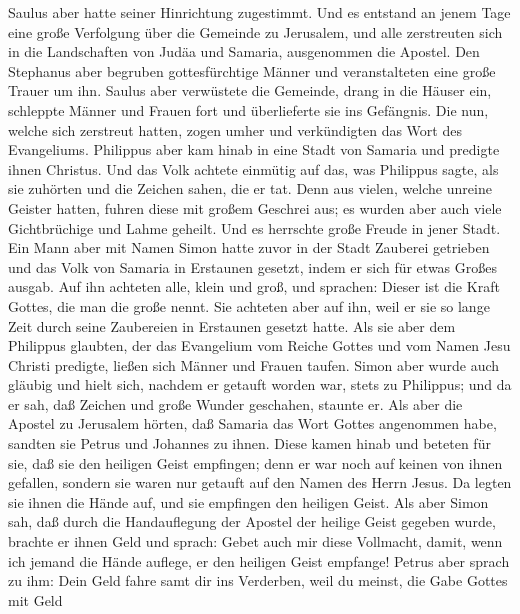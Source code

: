  Saulus aber hatte seiner Hinrichtung zugestimmt. Und es
entstand an jenem Tage eine große Verfolgung über die Gemeinde zu
Jerusalem, und alle zerstreuten sich in die Landschaften von Judäa und
Samaria, ausgenommen die Apostel.  Den Stephanus aber
begruben gottesfürchtige Männer und veranstalteten eine große Trauer um
ihn.  Saulus aber verwüstete die Gemeinde, drang in die
Häuser ein, schleppte Männer und Frauen fort und überlieferte sie ins
Gefängnis.  Die nun, welche sich zerstreut hatten, zogen
umher und verkündigten das Wort des Evangeliums. 
Philippus aber kam hinab in eine Stadt von Samaria und predigte ihnen
Christus.  Und das Volk achtete einmütig auf das, was
Philippus sagte, als sie zuhörten und die Zeichen sahen, die er tat.
 Denn aus vielen, welche unreine Geister hatten, fuhren
diese mit großem Geschrei aus; es wurden aber auch viele Gichtbrüchige
und Lahme geheilt.  Und es herrschte große Freude in jener
Stadt.  Ein Mann aber mit Namen Simon hatte zuvor in der
Stadt Zauberei getrieben und das Volk von Samaria in Erstaunen gesetzt,
indem er sich für etwas Großes ausgab.  Auf ihn achteten
alle, klein und groß, und sprachen: Dieser ist die Kraft Gottes, die man
die große nennt.  Sie achteten aber auf ihn, weil er sie
so lange Zeit durch seine Zaubereien in Erstaunen gesetzt hatte.
 Als sie aber dem Philippus glaubten, der das Evangelium
vom Reiche Gottes und vom Namen Jesu Christi predigte, ließen sich
Männer und Frauen taufen.  Simon aber wurde auch gläubig
und hielt sich, nachdem er getauft worden war, stets zu Philippus; und
da er sah, daß Zeichen und große Wunder geschahen, staunte er.
 Als aber die Apostel zu Jerusalem hörten, daß Samaria
das Wort Gottes angenommen habe, sandten sie Petrus und Johannes zu
ihnen.  Diese kamen hinab und beteten für sie, daß sie
den heiligen Geist empfingen;  denn er war noch auf
keinen von ihnen gefallen, sondern sie waren nur getauft auf den Namen
des Herrn Jesus.  Da legten sie ihnen die Hände auf, und
sie empfingen den heiligen Geist.  Als aber Simon sah,
daß durch die Handauflegung der Apostel der heilige Geist gegeben wurde,
brachte er ihnen Geld und sprach:  Gebet auch mir diese
Vollmacht, damit, wenn ich jemand die Hände auflege, er den heiligen
Geist empfange!  Petrus aber sprach zu ihm: Dein Geld
fahre samt dir ins Verderben, weil du meinst, die Gabe Gottes mit Geld
